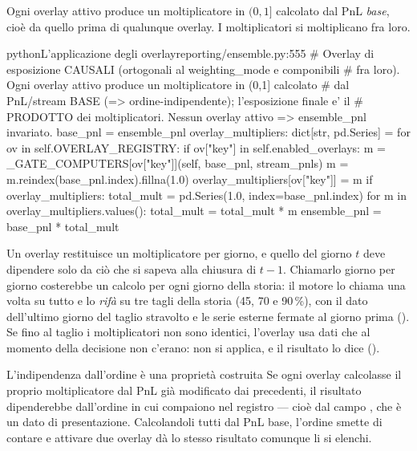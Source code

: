 Ogni overlay attivo produce un moltiplicatore in $(0,1]$ calcolato dal
PnL \emph{base}, cioè da quello prima di qualunque overlay. I moltiplicatori
si moltiplicano fra loro.

\begin{codiceInterno}{python}{L'applicazione degli overlay}{reporting/ensemble.py:555}
        # Overlay di esposizione CAUSALI (ortogonali al weighting_mode e componibili
        # fra loro). Ogni overlay attivo produce un moltiplicatore in (0,1] calcolato
        # dal PnL/stream BASE (=> ordine-indipendente); l'esposizione finale e' il
        # PRODOTTO dei moltiplicatori. Nessun overlay attivo => ensemble_pnl invariato.
        base_pnl = ensemble_pnl
        overlay_multipliers: dict[str, pd.Series] = {}
        for ov in self.OVERLAY_REGISTRY:
            if ov["key"] in self.enabled_overlays:
                m = _GATE_COMPUTERS[ov["key"]](self, base_pnl, stream_pnls)
                m = m.reindex(base_pnl.index).fillna(1.0)
                overlay_multipliers[ov["key"]] = m
        if overlay_multipliers:
            total_mult = pd.Series(1.0, index=base_pnl.index)
            for m in overlay_multipliers.values():
                total_mult = total_mult * m
            ensemble_pnl = base_pnl * total_mult
\end{codiceInterno}

\noindent
Un overlay restituisce un moltiplicatore per giorno, e quello del giorno $t$
deve dipendere solo da ciò che si sapeva alla chiusura di $t-1$. Chiamarlo
giorno per giorno costerebbe un calcolo per ogni giorno della storia: il
motore lo chiama una volta su tutto e lo \emph{rifà} su tre tagli della
storia (\num{45}, \num{70} e \num{90}\,\%), con il dato dell'ultimo giorno
del taglio stravolto e le serie esterne fermate al giorno prima
(). Se fino al taglio i moltiplicatori non sono
identici, l'overlay usa dati che al momento della decisione non c'erano: non
si applica, e il risultato lo dice ().

\begin{nota}{L'indipendenza dall'ordine è una proprietà costruita}
Se ogni overlay calcolasse il proprio moltiplicatore dal PnL già modificato
dai precedenti, il risultato dipenderebbe dall'ordine in cui compaiono nel
registro --- cioè dal campo , che è un dato di presentazione.
Calcolandoli tutti dal PnL base, l'ordine smette di contare e attivare due
overlay dà lo stesso risultato comunque li si elenchi.
\end{nota}

